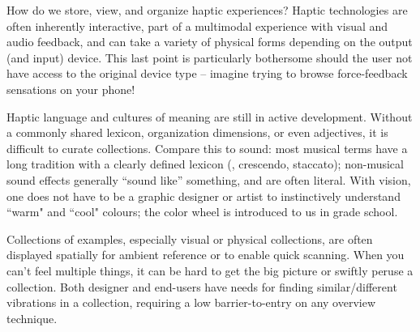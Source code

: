 

    How do we store, view, and organize haptic experiences?
    Haptic technologies are often inherently interactive, part of a multimodal experience with visual and audio feedback, and can take a variety of physical forms depending on the output (and input) device.
    This last point is particularly bothersome should the user not have access to the original device type -- imagine trying to browse force-feedback sensations on your phone!

    Haptic language and cultures of meaning are still in active development.
    Without a commonly shared lexicon, organization dimensions, or even adjectives, it is difficult to curate collections.
    Compare this to sound: most musical terms have a long tradition with a clearly defined lexicon (\eg, crescendo, staccato); non-musical sound effects generally ``sound like'' something, and are often literal.
    With vision, one does not have to be a graphic designer or artist to instinctively understand ``warm" and ``cool" colours; the color wheel is introduced to us in grade school.  
    
    Collections of examples, especially visual or physical collections, are often displayed spatially for ambient reference or to enable quick scanning.
    When you can't feel multiple things, it can be hard to get the big picture or swiftly peruse a collection.
    Both designer and end-users have needs for finding similar/different vibrations in a collection, requiring a low barrier-to-entry on any overview technique.


%
%
